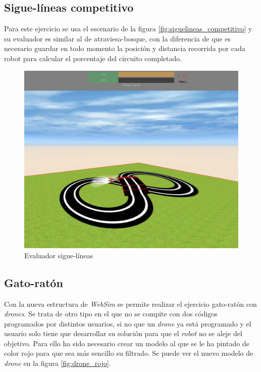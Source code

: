 \subsection{Sigue-líneas competitivo}

Para este ejercicio se usa el escenario de la figura \ref{fig:siguelineas_competitivo} y su evaluador es similar al de atraviesa-bosque, con la diferencia de que es necesario guardar en todo momento la posición y distancia recorrida por cada robot para calcular el porcentaje del circuito completado.


\begin{figure}[H]
    \centering           
    \includegraphics[scale=0.25]{img/evaluator_follow_line.png}
    \caption{Evaluador sigue-líneas}
    \label{fig:evaluador_siguelineas}
\end{figure}

\subsection{Gato-ratón}

Con la nueva estructura de \textit{WebSim} se permite realizar el ejercicio gato-ratón con \textit{drones}. Se trata de otro tipo en el que no se compite con dos códigos programados por distintos usuarios, si no que un \textit{drone} ya está programado y el usuario solo tiene que desarrollar su solución para que el \textit{robot} no se aleje del objetivo. Para ello ha sido necesario crear un modelo al que se le ha pintado de color rojo para que sea más sencillo su filtrado. Se puede ver el nuevo modelo de \textit{drone} en la figura \ref{fig:drone_rojo}.


